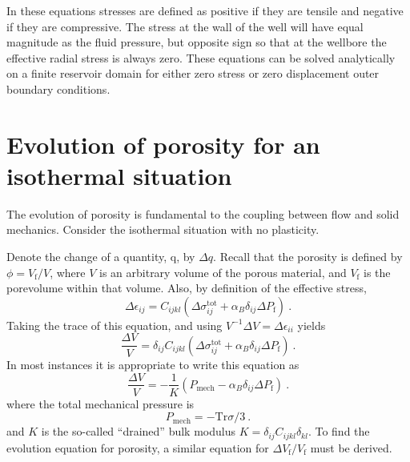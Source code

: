 \documentclass[12pt]{report}
\def\mechpressure{P_{\mathrm{mech}}}
\begin{document}
In these equations stresses are defined as positive if they are tensile and negative if they are compressive. The stress at the wall of the well will have equal magnitude as the fluid pressure, but opposite sign so that at the wellbore the effective radial stress is always zero.  These equations can be solved analytically on a finite reservoir domain for either zero stress or zero displacement outer boundary conditions.

%
%

\chapter{Evolution of porosity for an isothermal situation}
\label{chap.evol.por}

The evolution of porosity is fundamental to the coupling between flow
and solid mechanics.  Consider the isothermal situation with no
plasticity.

Denote the change of a quantity, q, by $\Delta
q$.  Recall that the porosity is defined by $\phi = V_{\mathrm{f}}/V$,
where $V$ is an arbitrary volume of the porous material, and
$V_{\mathrm{f}}$ is the porevolume within that volume.  Also, by
definition of the effective stress,
\begin{equation}
\Delta \epsilon_{ij} = C_{ijkl}(\Delta\sigma_{ij}^{\mathrm{tot}}  + \alpha_{B}
\delta_{ij}\Delta P_{\mathrm{f}})
\ .
\end{equation}
Taking the trace of this equation, and using $V^{-1}\Delta V = \Delta
\epsilon_{ii}$ yields
\begin{equation}
\frac{\Delta V}{V} = \delta_{ij}C_{ijkl}(\Delta\sigma_{ij}^{\mathrm{tot}}+
\alpha_{B} \delta_{ij}\Delta P_{\mathrm{f}})
\ .
\end{equation}
In most instances it is appropriate to write this equation as
\begin{equation}
\frac{\Delta V}{V} = -\frac{1}{K}(\mechpressure - \alpha_{B} \delta_{ij}\Delta P_{\mathrm{f}})
\ .
\label{eqn.fund.volstrain}
\end{equation}
where the total mechanical pressure is
\begin{equation}
\mechpressure = - \mbox{Tr}\sigma/3 \ .
\end{equation}
and $K$ is the so-called ``drained'' bulk modulus $K = \delta_{ij}C_{ijkl}\delta_{kl}$.
To find the evolution equation for porosity, a similar equation for
$\Delta V_{\mathrm{f}}/V_{\mathrm{f}}$ must be derived.
\end{document}
